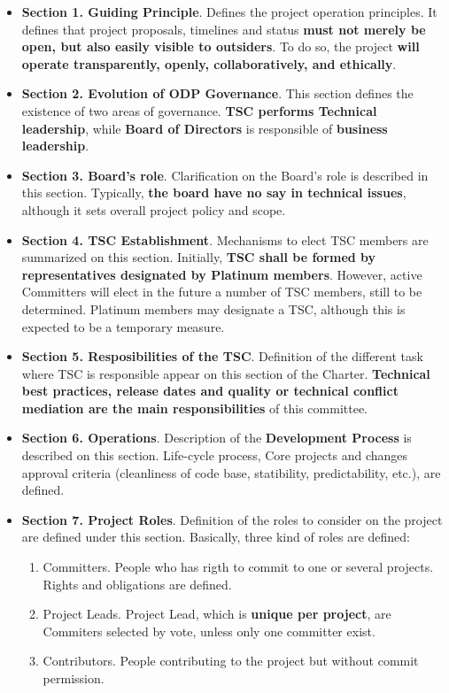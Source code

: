 \documentclass[a4paper, 12pt]{book}
\begin{document}
\begin{itemize}\itemsep0pt
\item{\textbf{Section 1. Guiding Principle}}. Defines the project operation principles. It defines that project proposals, timelines and status \textbf{must not merely be open, but also easily visible to outsiders}. To do so, the project \textbf{will operate transparently, openly, collaboratively, and ethically}.
\item{\textbf{Section 2. Evolution of ODP Governance}}. This section defines the existence of two areas of governance. \textbf{TSC performs Technical leadership}, while \textbf{Board of Directors} is responsible of \textbf{business leadership}.
\item{\textbf{Section 3. Board's role}}. Clarification on the Board's role is described in this section. Typically, \textbf{the board have no say in technical issues}, although it sets overall project policy and scope.
\item{\textbf{Section 4. TSC Establishment}}. Mechanisms to elect TSC members are summarized on this section. Initially, \textbf{TSC shall be formed by representatives designated by Platinum members}. However, active Committers will elect in the future a number of TSC members, still to be determined. Platinum members may designate a TSC, although this is expected to be a temporary measure.
\item{\textbf{Section 5. Resposibilities of the TSC}}. Definition of the different task where TSC is responsible appear on this section of the Charter. \textbf{Technical best practices, release dates and quality or technical conflict mediation are the main responsibilities} of this committee.
\item{\textbf{Section 6. Operations}}. Description of the \textbf{Development Process} is described on this section. Life-cycle process, Core projects and changes approval criteria (cleanliness of code base, statibility, predictability, etc.), are defined.
\item{\textbf{Section 7. Project Roles}}. Definition of the roles to consider on the project are defined under this section. Basically, three kind of roles are defined:
\begin{enumerate}\itemsep0pt
\item{Committers}. People who has rigth to commit to one or several projects. Rights and obligations are defined.
\item{Project Leads}. Project Lead, which is \textbf{unique per project}, are Commiters selected by vote, unless only one committer exist.
\item{Contributors}. People contributing to the project but without commit permission.
\end{enumerate}
\end{itemize}
\end{document}
